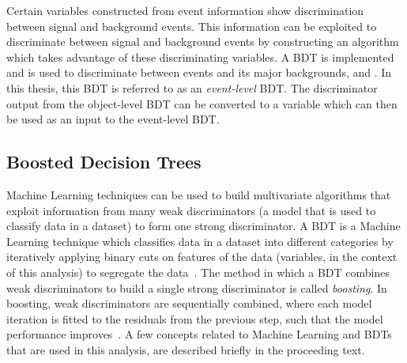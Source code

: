 Certain variables constructed from event information show discrimination between signal and background events. This information can be exploited to discriminate between signal and background events by constructing an algorithm which takes advantage of these discriminating variables. A BDT is implemented and is used to discriminate between \tWZ events and its major backgrounds, \ttZ and \ZZ. In this thesis, this BDT is referred to as an \textit{event-level} BDT. The discriminator output from the object-level BDT can be converted to a variable which can then be used as an input to the event-level BDT.

\subsection{Boosted Decision Trees}
\label{sec:bdt}
Machine Learning techniques can be used to build multivariate algorithms that exploit information from many weak discriminators (a model that is used to classify data in a dataset) to form one strong discriminator. A BDT is a Machine Learning technique which classifies data in a dataset into different categories by iteratively applying binary cuts on features of the data (variables, in the context of this analysis) to segregate the data~\cite{intro-bdt}. The method in which a BDT combines weak discriminators to build a single strong discriminator is called \textit{boosting}. In boosting, weak discriminators are sequentially combined, where each model iteration is fitted to the residuals from the previous step, such that the model performance improves~\cite{hastie2009the}. A few concepts related to Machine Learning and BDTs that are used in this analysis, are described briefly in the proceeding text.\\

